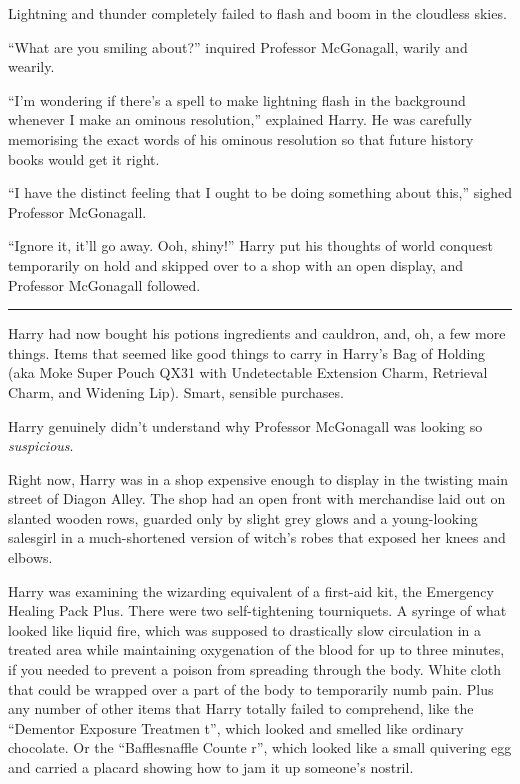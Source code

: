 Lightning and thunder completely failed to flash and boom in the cloudless skies.

``What are you smiling about?'' inquired Professor McGonagall, warily and wearily.

``I'm wondering if there's a spell to make lightning flash in the background whenever I make an ominous resolution,'' explained Harry. He was carefully memorising the exact words of his ominous resolution so that future history books would get it right.

``I have the distinct feeling that I ought to be doing something about this,'' sighed Professor McGonagall.

``Ignore it, it'll go away. Ooh, shiny!'' Harry put his thoughts of world conquest temporarily on hold and skipped over to a shop with an open display, and Professor McGonagall followed.

\begin{center}\rule{3in}{0.4pt}\end{center}

Harry had now bought his potions ingredients and cauldron, and, oh, a few more things. Items that seemed like good things to carry in Harry's Bag of Holding (aka Moke Super Pouch QX31 with Undetectable Extension Charm, Retrieval Charm, and Widening Lip). Smart, sensible purchases.

Harry genuinely didn't understand why Professor McGonagall was looking so \emph{suspicious}.

Right now, Harry was in a shop expensive enough to display in the twisting main street of Diagon Alley. The shop had an open front with merchandise laid out on slanted wooden rows, guarded only by slight grey glows and a young-looking salesgirl in a much-shortened version of witch's robes that exposed her knees and elbows.

Harry was examining the wizarding equivalent of a first-aid kit, the Emergency Healing Pack Plus. There were two self-tightening tourniquets. A syringe of what looked like liquid fire, which was supposed to drastically slow circulation in a treated area while maintaining oxygenation of the blood for up to three minutes, if you needed to prevent a poison from spreading through the body. White cloth that could be wrapped over a part of the body to temporarily numb pain. Plus any number of other items that Harry totally failed to comprehend, like the ``Dementor Exposure Treatmen t'', which looked and smelled like ordinary chocolate. Or the ``Bafflesnaffle Counte r'', which looked like a small quivering egg and carried a placard showing how to jam it up someone's nostril.

